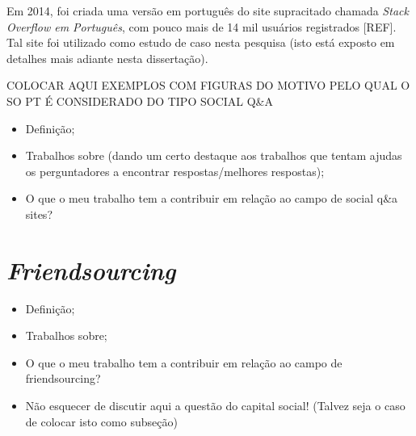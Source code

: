 Em 2014, foi criada uma versão em português do site supracitado chamada \textit{Stack Overflow em Português}, com pouco mais de 14 mil usuários registrados [REF]. Tal site foi utilizado como estudo de caso nesta pesquisa (isto está exposto em detalhes mais adiante nesta dissertação).

COLOCAR AQUI EXEMPLOS COM FIGURAS DO MOTIVO PELO QUAL O SO PT É CONSIDERADO DO TIPO SOCIAL Q\&A

\begin{itemize}
  \item Definição;
  \item Trabalhos sobre (dando um certo destaque aos trabalhos que tentam ajudas os perguntadores a encontrar respostas/melhores respostas);
  \item O que o meu trabalho tem a contribuir em relação ao campo de social q\&a sites?
\end{itemize}
\section{\textit{Friendsourcing}}
\begin{itemize}
  \item Definição;
  \item Trabalhos sobre;
  \item O que o meu trabalho tem a contribuir em relação ao campo de friendsourcing?
  \item Não esquecer de discutir aqui a questão do capital social! (Talvez seja o caso de colocar isto como subseção)
\end{itemize}